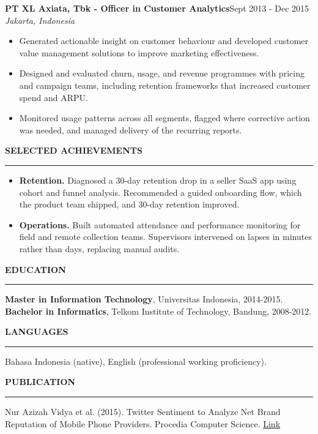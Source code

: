 ﻿\documentclass[10.5pt,a4paper]{article}
\newcommand{\cvsection}[1]{%
  \vspace{8pt}%
  {\normalsize\bfseries\MakeUppercase{#1}}\\[-7pt]
  \rule{\textwidth}{0.6pt}\vspace{2pt}%
}
\newcommand{\role}[3]{%
  \vspace{3pt}%
  {\bfseries #1}\hfill{\small #3}\\
  {\itshape #2}\par\vspace{1pt}%
}
\begin{document}
\role{PT XL Axiata, Tbk - Officer in Customer Analytics}{Jakarta, Indonesia}{Sept 2013 - Dec 2015}
\begin{itemize}
  \item Generated actionable insight on customer behaviour and developed customer value management solutions to improve marketing effectiveness.
  \item Designed and evaluated churn, usage, and revenue programmes with pricing and campaign teams, including retention frameworks that increased customer spend and ARPU.
  \item Monitored usage patterns across all segments, flagged where corrective action was needed, and managed delivery of the recurring reports.
\end{itemize}

\cvsection{Selected Achievements}
\begin{itemize}
  \item \textbf{Retention.} Diagnosed a 30-day retention drop in a seller SaaS app using cohort and funnel analysis. Recommended a guided onboarding flow, which the product team shipped, and 30-day retention improved.
  \item \textbf{Operations.} Built automated attendance and performance monitoring for field and remote collection teams. Supervisors intervened on lapses in minutes rather than days, replacing manual audits.
\end{itemize}

\cvsection{Education}
\textbf{Master in Information Technology}, Universitas Indonesia, 2014-2015.\\
\textbf{Bachelor in Informatics}, Telkom Institute of Technology, Bandung, 2008-2012.

\cvsection{Languages}
Bahasa Indonesia (native), English (professional working proficiency).

\cvsection{Publication}
Nur Azizah Vidya et al. (2015). Twitter Sentiment to Analyze Net Brand Reputation of Mobile Phone Providers. Procedia Computer Science. \href{https://www.sciencedirect.com/science/article/pii/S1877050915036200}{Link}
\end{document}
